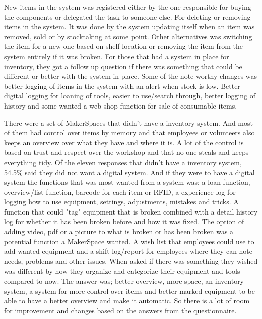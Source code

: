 New items in the system was registered either by the one responsible for buying the components or delegated the task to someone else. For deleting or removing items in the system. It was done by the system updating itself when an item was removed, sold or by stocktaking at some point. Other alternatives was switching the item for a new one based on shelf location or removing the item from the system entirely if it was broken.
For those that had a system in place for inventory, they got a follow up question if there was something that could be different or better with the system in place. Some of the note worthy changes was better logging of items in the system with an alert when stock is low. Better digital logging for loaning of tools, easier to use/search through, better logging of history and some wanted a web-shop function for sale of consumable items. 

There were a set of MakerSpaces that didn't have a inventory system. And most of them had control over items by memory and that employees or volunteers also keeps an overview over what they have and where it is. A lot of the control is based on trust and respect over the workshop and that no one steals and keeps everything tidy. Of the eleven responses that didn't have a inventory system, 54.5\% said they did not want a digital system. And if they were to have a digital system the functions that was most wanted from a system was; a loan function, overview/list function, barcode for each item or RFID, a experience log for logging how to use equipment, settings, adjustments, mistakes and tricks. A function that could "tag" equipment that is broken combined with a detail history log for whether it has been broken before and how it was fixed. The option of adding video, pdf or a picture to what is broken or has been broken was a potential function a MakerSpace wanted. A wish list that employees could use to add wanted equipment and a shift log/report for employees where they can note needs, problems and other issues. 
When asked if there was something they wished was different by how they organize and categorize their equipment and tools compared to now. The answer was; better overview, more space, an inventory system,  a system for more control over items and better marked equipment to be able to have a better overview and make it automatic. So there is a lot of room for improvement and changes based on the answers from the questionnaire.

